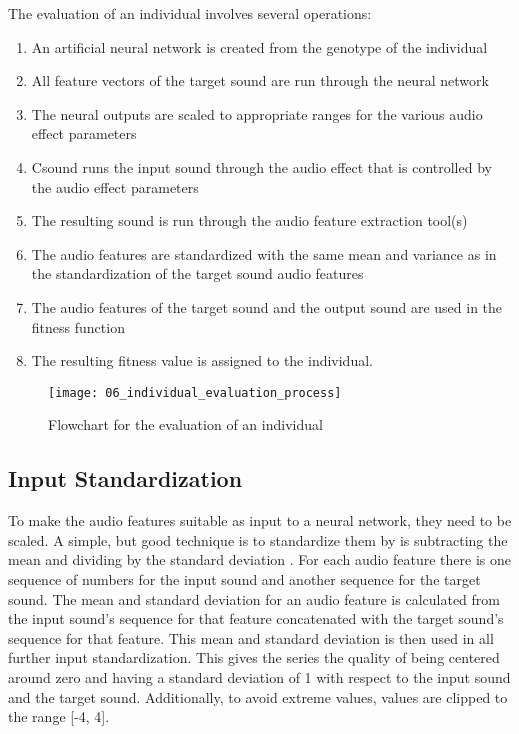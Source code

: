The evaluation of an individual involves several operations:

\begin{enumerate}  
\item An artificial neural network is created from the genotype of the individual
\item All feature vectors of the target sound are run through the neural network
\item The neural outputs are scaled to appropriate ranges for the various audio effect parameters
\item Csound runs the input sound through the audio effect that is controlled by the audio effect parameters
\item The resulting sound is run through the audio feature extraction tool(s)
\item The audio features are standardized with the same mean and variance as in the standardization of the target sound audio features
\item The audio features of the target sound and the output sound are used in the fitness function
\item The resulting fitness value is assigned to the individual.
\end{enumerate}

\begin{figure}[h]
    \centering
    \texttt{[image: 06\_individual\_evaluation\_process]}
    \caption{Flowchart for the evaluation of an individual}
    \label{fig:individual_evaluation_process}
\end{figure}

\subsection{Input Standardization}
To make the audio features suitable as input to a neural network, they need to be scaled. A simple, but good technique is to standardize them by is subtracting the mean and dividing by the standard deviation \citep{sarle2014}. For each audio feature there is one sequence of numbers for the input sound and another sequence for the target sound. The mean and standard deviation for an audio feature is calculated from the input sound’s sequence for that feature concatenated with the target sound’s sequence for that feature. This mean and standard deviation is then used in all further input standardization. This gives the series the quality of being centered around zero and having a standard deviation of 1 with respect to the input sound and the target sound. Additionally, to avoid extreme values, values are clipped to the range [-4, 4].

